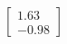 \documentclass[preview]{standalone}
\begin{document}
\begin{align*}
\begin{bmatrix} 1.63 \\ -0.98 \end{bmatrix}
\end{align*}
\end{document}
